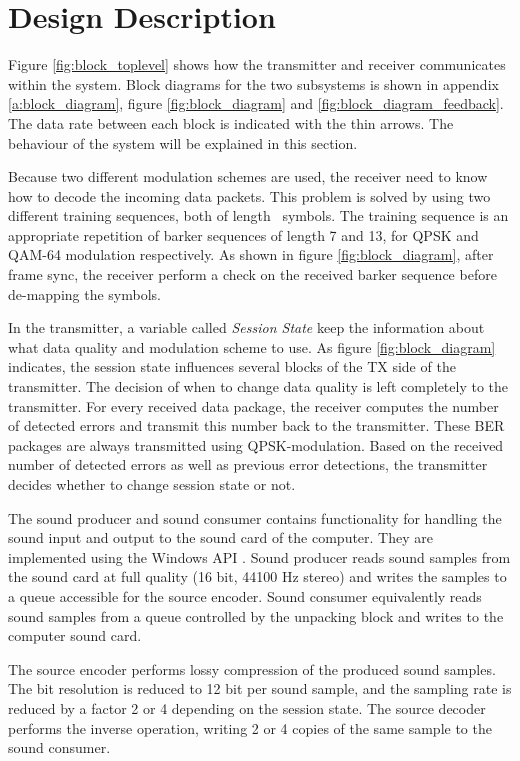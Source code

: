 \section{Design Description}
\label{sec:design_description}
Figure \ref{fig:block_toplevel} shows how the transmitter and receiver communicates within the system. Block diagrams for the two subsystems is shown in appendix \ref{a:block_diagram}, figure \ref{fig:block_diagram} and \ref{fig:block_diagram_feedback}. The data rate between each block is indicated with the thin arrows. The behaviour of the system will be explained in this section. 

Because two different modulation schemes are used, the receiver need to know how to decode the incoming data packets. This problem is solved by using two different training sequences, both of length \barkerSymbols\   symbols. The training sequence is an appropriate repetition of barker sequences of length 7 and 13, for QPSK and QAM-64 modulation respectively. As shown in figure \ref{fig:block_diagram}, after frame sync, the receiver perform a check on the received barker sequence before de-mapping the symbols. 

In the transmitter, a variable called \textit{Session State} keep the information about what data quality and modulation scheme to use. As figure \ref{fig:block_diagram} indicates, the session state influences several blocks of the TX side of the transmitter. The decision of when to change data quality is left completely to the transmitter. For every received data package, the receiver computes the number of detected errors and transmit this number back to the transmitter. These BER packages are always transmitted using QPSK-modulation. Based on the received number of detected errors as well as previous error detections, the transmitter decides whether to change session state or not. 

The sound producer and sound consumer contains functionality for handling the sound input and output to the sound card of the computer. They are implemented using the Windows API \cite{WinAPI}. Sound producer reads sound samples from the sound card at full quality (16 bit, 44100 Hz stereo) and writes the samples to a queue accessible for the source encoder. Sound consumer equivalently reads sound samples from a queue controlled by the unpacking block and writes to the computer sound card. 

The source encoder performs lossy compression of the produced sound samples. The bit resolution is reduced to 12 bit per sound sample, and the sampling rate is reduced by a factor 2 or 4 depending on the session state. The source decoder performs the inverse operation, writing 2 or 4 copies of the same sample to the sound consumer.  

